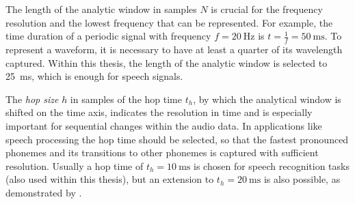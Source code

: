 The length of the analytic window in samples $N$ is crucial for the frequency resolution and the lowest frequency that can be represented.
For example, the time duration of a periodic signal with frequency $f=\SI{20}{\hertz}$ is $t=\frac{1}{f} = \SI{50}{\milli\second}$.
To represent a waveform, it is necessary to have at least a quarter of its wavelength captured.
Within this thesis, the length of the analytic window is selected to \SI{25}{\milli\second}, which is enough for speech signals.

The \emph{hop size} $h$ in samples of the hop time $t_h$, by which the analytical window is shifted on the time axis, indicates the resolution in time and is especially important for sequential changes within the audio data.
In applications like speech processing the hop time should be selected, so that the fastest pronounced phonemes and its transitions to other phonemes is captured with sufficient resolution.
Usually a hop time of $t_{h}=\SI{10}{\milli\second}$ is chosen for speech recognition tasks (also used within this thesis), but an extension to $t_{h}=\SI{20}{\milli\second}$ is also possible, as demonstrated by \cite{Peter2020}.

